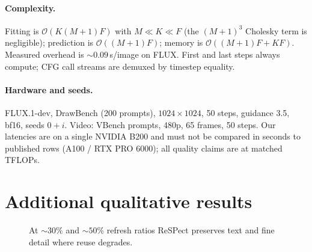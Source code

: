 \documentclass[10pt,twocolumn,letterpaper]{article}
\begin{document}
\paragraph{Complexity.} Fitting is $\mathcal{O}(K(M{+}1)F)$ with
$M \ll K \ll F$ (the $(M{+}1)^3$ Cholesky term is negligible);
prediction is $\mathcal{O}((M{+}1)F)$; memory is
$\mathcal{O}((M{+}1)F + KF)$. Measured overhead is ${\sim}0.09$\,s/image
on FLUX. First and last steps always compute; CFG call streams are
demuxed by timestep equality.

\paragraph{Hardware and seeds.} FLUX.1-dev, DrawBench (200 prompts),
$1024{\times}1024$, 50 steps, guidance 3.5, bf16, seeds $0{+}i$.
Video: VBench prompts, 480p, 65 frames, 50 steps. Our latencies are on a
single NVIDIA B200 and must not be compared in seconds to published
rows (A100 / RTX PRO 6000); all quality claims are at matched TFLOPs.

\section{Additional qualitative results}
\label{app:qual}

\begin{figure}[h]
  \centering
  \caption{At ${\sim}30\%$ and ${\sim}50\%$ refresh ratios ReSPect
  preserves text and fine detail where reuse degrades.}
  \label{fig:app-qual}
\end{figure}
\end{document}
